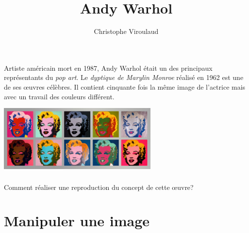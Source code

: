 \documentclass[svgnames,11pt]{beamer}
\author[]{Christophe Viroulaud}
\title{Andy Warhol}
\date{\framebox{\textbf{Lang 07}}}
\institute{Première - NSI}
\begin{document}
\begin{frame}
    \titlepage
\end{frame}
\begin{frame}
    \frametitle{}

    Artiste américain mort en 1987, Andy Warhol était un  des principaux représentants du \emph{pop art}.	Le \emph{dyptique de Marylin Monroe} réalisé en 1962 est une de ses œuvres célèbres. Il contient cinquante fois la même image de l'actrice mais avec un travail des couleurs différent.
    \begin{center}
        \centering
        \includegraphics[width=8cm]{ressources/marylin.jpg}
        \label{IMG}
    \end{center}
\end{frame}
\begin{frame}
    \frametitle{}

    \begin{framed}\centering
        Comment réaliser une reproduction du concept de cette œuvre?
    \end{framed}

\end{frame}
\section{Manipuler une image}
\end{document}
